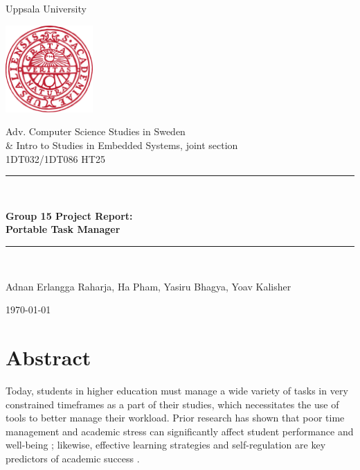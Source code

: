 \documentclass[11pt,oneside]{article}
\begin{document}
\begin{titlepage}
    \centering
    \vspace*{\fill}

    {\Large Uppsala University\par}
    \vspace{1cm}

    \includegraphics[width=0.25\textwidth]{Uppsala_University_seal.png}\par
    \vspace{1cm}
    
    {\Large Adv. Computer Science Studies in Sweden \\ \& Intro to Studies in Embedded Systems, joint section \\ 1DT032/1DT086 HT25}

    \rule{\textwidth}{0.4pt}\\[0.5cm] %
    {\Huge\bfseries Group 15 Project Report:\\Portable Task Manager\par}
    \vspace{0.5cm}
    \rule{\textwidth}{0.4pt}\\[2cm]    %

    
    {\Large Adnan Erlangga Raharja, Ha Pham, Yasiru Bhagya, Yoav Kalisher\par}
    \vspace{1cm}

    {\Large \today\par}

    \vspace*{\fill}
\end{titlepage}

\vspace*{3cm}

\section*{Abstract}

Today, students in higher education must manage a wide variety of tasks in very constrained timeframes as a part of their studies, which necessitates the use of tools to better manage their workload. Prior research has shown that poor time management and academic stress can significantly affect student performance and well-being \citep{misra2000college}; likewise, effective learning strategies and self-regulation are key predictors of academic success \citep{zimmerman2002becoming}.
\end{document}
